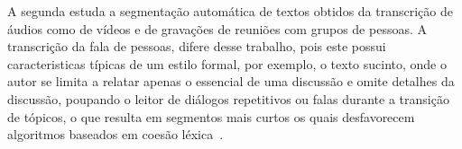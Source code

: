 %
%
A segunda estuda a segmentação automática de textos obtidos da transcrição de áudios como de vídeos e de gravações de reuniões com grupos de pessoas. 
A transcrição da fala de pessoas, difere desse trabalho, pois este possui caracteristicas típicas de um estilo formal, por exemplo, o texto sucinto, onde o autor se limita a relatar apenas o essencial de uma discussão e omite detalhes da discussão, poupando o leitor de diálogos repetitivos ou falas durante a transição de tópicos, o que resulta em segmentos mais curtos os quais desfavorecem algoritmos baseados em coesão léxica~\cite{Choi2000}. 








